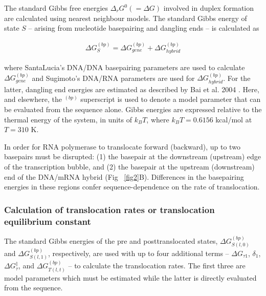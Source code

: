 \documentclass[10pt,letterpaper]{article}
\begin{document}

The standard Gibbs free energies $\Delta_r G^0 ( = \Delta G)$  involved in duplex formation are calculated using nearest neighbour models. The standard Gibbs energy of state $S$ -- arising from nucleotide basepairing and dangling ends -- is calculated as


\begin{eqnarray}
    \Delta G^{(bp)}_{S} =\Delta G^{(bp)}_{gene} +  \Delta G^{(bp)}_{hybrid}
\end{eqnarray}

where SantaLucia's DNA/DNA basepairing parameters \cite{santalucia1998unified} are used to calculate $\Delta G^{(bp)}_{gene}$ and Sugimoto's DNA/RNA parameters \cite{wu2002temperature} are used for $\Delta G^{(bp)}_{hybrid}$. For the latter, dangling end energies are estimated as described by Bai et al. 2004 \cite{bai2004sequence}. Here, and elsewhere, the $^{(bp)}$ superscript is used to denote a model parameter that can be evaluated from the sequence alone. Gibbs energies are expressed relative to the thermal energy of the system,  in units of $k_BT$, where $k_BT = 0.6156$ kcal/mol at $T=310$ K. \par





In order for RNA polymerase to translocate forward (backward), up to two basepairs must be disrupted: (1) the basepair at the downstream (upstream) edge of the transcription bubble, and (2) the basepair at the upstream (downstream) end of the DNA/mRNA hybrid (Fig ~\ref{fig2}B). Differences in the basepairing energies in these regions confer sequence-dependence on the rate of translocation.


\subsubsection*{Calculation of translocation rates or translocation equilibrium constant}





The standard Gibbs energies of the pre and posttranslocated states, $\Delta G^{(bp)}_{S(l,0)}$  and  $\Delta G^{(bp)}_{S(l,1)}$, respectively, are used with up to four additional terms -- $\Delta G_{\tau 1}$, $\delta_1$, $\Delta G^\ddag_{\tau}$, and $\Delta G_{T(l,t)}^{(bp)}$ --  to calculate the translocation rates. The first three are model parameters which must be estimated while the latter is directly evaluated from the sequence.
\end{document}
